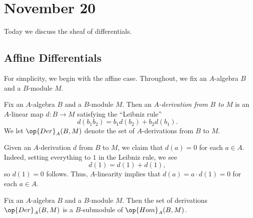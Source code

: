 \documentclass[../notes.tex]{subfiles}
\begin{document}
\section{November 20}

Today we discuss the sheaf of differentials.

\subsection{Affine Differentials}
For simplicity, we begin with the affine case. Throughout, we fix an $A$-algebra $B$ and a $B$-module $M$.
\begin{definition}[Derivation]
	Fix an $A$-algebra $B$ and a $B$-module $M$. Then an \textit{$A$-derivation from $B$ to $M$} is an $A$-linear map $d\colon B\to M$ satisfying the ``Leibniz rule''
	\[d(b_1b_2)=b_1d(b_2)+b_2d(b_1).\]
	We let $\op{Der}_A(B,M)$ denote the set of $A$-derivations from $B$ to $M$.
\end{definition}
\begin{remark}
	Given an $A$-derivation $d$ from $B$ to $M$, we claim that $d(a)=0$ for each $a\in A$. Indeed, setting everything to $1$ in the Leibniz rule, we see
	\[d(1)=d(1)+d(1),\]
	so $d(1)=0$ follows. Thus, $A$-linearity implies that $d(a)=a\cdot d(1)=0$ for each $a\in A$.
\end{remark}
\begin{lemma}
	Fix an $A$-algebra $B$ and a $B$-module $M$. Then the set of derivations $\op{Der}_A(B,M)$ is a $B$-submodule of $\op{Hom}_A(B,M)$.
\end{lemma}
\end{document}

